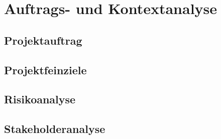
\section{Auftrags- und Kontextanalyse}


\subsection{Projektauftrag}


\subsection{Projektfeinziele}


\subsection{Risikoanalyse}

\subsection{Stakeholderanalyse}
